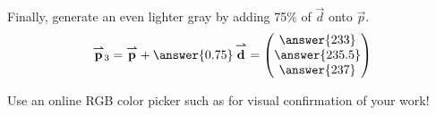 \documentclass{ximera}
\begin{document}
\begin{exercise}
  Finally, generate an even lighter gray by adding 75\% of $\vec{d}$
  onto $\vec{p}$.
  \[
    \vec{p}_3 = \vec{p} + \answer{0.75}\,\vec{d} =
    \begin{pmatrix}
      \answer{233}\\
      \answer{235.5}\\
      \answer{237}
    \end{pmatrix}
  \]

  \begin{feedback}[correct]
    Use an online RGB color picker such as
     for visual confirmation of
    your work!
  \end{feedback}

%
%

\end{exercise}
\end{document}
